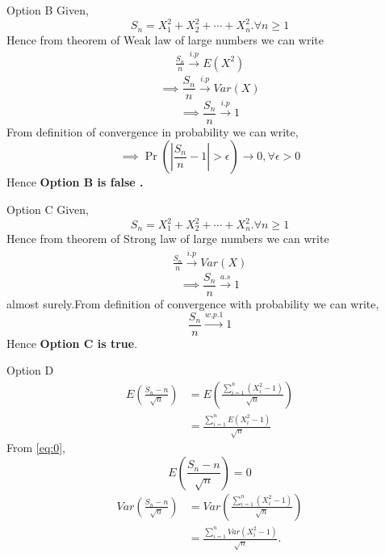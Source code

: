 \documentclass{beamer}
\providecommand{\brak}[1]{\ensuremath{\left(#1\right)}}
\begin{document}
\begin{frame}{Option B}
    Given, 
\begin{equation}
    S_{n}=X_{1}^2+X_{2}^2+\cdots+X_{n}^2.\forall n\geq 1
\end{equation}
Hence from theorem of Weak law of large numbers we can write 
\begin{align}
    \frac{S_n}{n} \xrightarrow{i.p} E(X^2)
\end{align}
\begin{equation}
   \implies  \frac{S_n}{n} \xrightarrow{i.p} Var(X)
\end{equation}
\begin{equation}
    \implies \frac{S_n}{n} \xrightarrow{i.p} 1
\end{equation}
From definition of convergence in probability we can write,
\begin{equation}
    \implies \Pr{\brak{{\left|\frac{S_n}{n}-1\right|>\epsilon}}}\to 0,\forall \epsilon>0
\end{equation}
Hence \textbf{Option B is false .}
\end{frame}
\begin{frame}{Option C}
    Given, 
\begin{equation}
    S_{n}=X_{1}^2+X_{2}^2+\cdots+X_{n}^2.\forall n\geq 1
\end{equation}
Hence from theorem of Strong law of large numbers we can write 
\begin{align}
    \frac{S_n}{n} \xrightarrow{i.p} Var(X)
\end{align}
\begin{equation}
    \implies \frac{S_n}{n} \xrightarrow{a.s} 1
\end{equation}
almost surely.From definition of convergence with probability we can write,
\begin{equation}
    \frac{S_{n}}{n} \xrightarrow{w.p.1} 1
\end{equation}
Hence \textbf{Option C is true}.
\end{frame}
\begin{frame}{Option D}
\begin{align}
    E\brak{\frac{S_{n}-n}{\sqrt{n}}}&=E\brak{\frac{\sum_{i=1}^{n}{(X_{i}^{2}-1)}}{\sqrt{n}}}\\
    &={\frac{\sum_{i=1}^{n}E{(X_{i}^{2}-1)}}{\sqrt{n}}}
\end{align}
From \eqref{eq:0},
\begin{equation}
    E\brak{\frac{S_{n}-n}{\sqrt{n}}}=0
\end{equation}
\begin{align}
     Var\brak{\frac{S_{n}-n}{\sqrt{n}}}&=Var\brak{\frac{\sum_{i=1}^{n}(X_i^2-1)}{\sqrt{n}}}\\
     &=\frac{\sum_{i=1}^{n}Var(X_i^2-1)}{\sqrt{n}}.
\end{align}
\end{frame}
\end{document}
